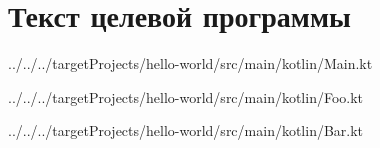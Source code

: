 \chapter{Текст целевой программы}
\label{ch:target_prog}


{../../../targetProjects/hello-world/src/main/kotlin/Main.kt}


{../../../targetProjects/hello-world/src/main/kotlin/Foo.kt}


{../../../targetProjects/hello-world/src/main/kotlin/Bar.kt}